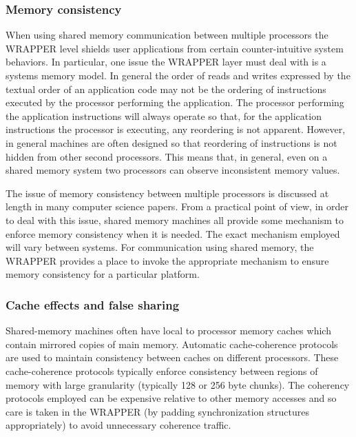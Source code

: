 \subsubsection{Memory consistency}
\label{sec:memory_consistency}

When using shared memory communication between multiple processors the
WRAPPER level shields user applications from certain counter-intuitive
system behaviors.  In particular, one issue the WRAPPER layer must
deal with is a systems memory model.  In general the order of reads
and writes expressed by the textual order of an application code may
not be the ordering of instructions executed by the processor
performing the application.  The processor performing the application
instructions will always operate so that, for the application
instructions the processor is executing, any reordering is not
apparent.  However, in general machines are often designed so that
reordering of instructions is not hidden from other second processors.
This means that, in general, even on a shared memory system two
processors can observe inconsistent memory values.

The issue of memory consistency between multiple processors is
discussed at length in many computer science papers.  From a practical
point of view, in order to deal with this issue, shared memory
machines all provide some mechanism to enforce memory consistency when
it is needed.  The exact mechanism employed will vary between systems.
For communication using shared memory, the WRAPPER provides a place to
invoke the appropriate mechanism to ensure memory consistency for a
particular platform.

\subsubsection{Cache effects and false sharing}
\label{sec:cache_effects_and_false_sharing}

Shared-memory machines often have local to processor memory caches
which contain mirrored copies of main memory.  Automatic cache-coherence
protocols are used to maintain consistency between caches on different
processors.  These cache-coherence protocols typically enforce consistency
between regions of memory with large granularity (typically 128 or 256 byte
chunks).  The coherency protocols employed can be expensive relative to other
memory accesses and so care is taken in the WRAPPER (by padding synchronization
structures appropriately) to avoid unnecessary coherence traffic.

